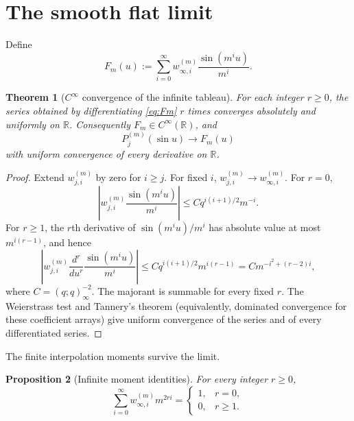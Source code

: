 \documentclass[11pt]{article}
\newtheorem{theorem}{Theorem}[section]
\newtheorem{proposition}[theorem]{Proposition}
\theoremstyle{remark}
\begin{document}
\section{The smooth flat limit}
\label{sec:limit}

Define
\begin{equation}
F_m(u)
:=
\sum_{i=0}^{\infty}w^{(m)}_{\infty,i}
\frac{\sin(m^iu)}{m^i}.
\label{eq:Fm}
\end{equation}

\begin{theorem}[$C^\infty$ convergence of the infinite tableau]
\label{thm:Cinf}
For each integer $r\ge0$, the series obtained by differentiating
\eqref{eq:Fm} $r$ times converges absolutely and uniformly on $\mathbb R$.
Consequently $F_m\in C^\infty(\mathbb R)$, and
\begin{equation}
P^{(m)}_j(\sin u)\longrightarrow F_m(u)
\label{eq:Cinfconv}
\end{equation}
with uniform convergence of every derivative on $\mathbb R$.
\end{theorem}

\begin{proof}
Extend $w^{(m)}_{j,i}$ by zero for $i\ge j$.  For fixed $i$,
$w^{(m)}_{j,i}\to w^{(m)}_{\infty,i}$.  For $r=0$,
\[
\left|w^{(m)}_{j,i}\frac{\sin(m^iu)}{m^i}\right|
\le C q^{i(i+1)/2}m^{-i}.
\]
For $r\ge1$, the $r$th derivative of
$\sin(m^iu)/m^i$ has absolute value at most $m^{i(r-1)}$, and hence
\[
\left|w^{(m)}_{j,i}
\frac{d^r}{du^r}\frac{\sin(m^iu)}{m^i}\right|
\le
C q^{i(i+1)/2}m^{i(r-1)}
=Cm^{-i^2+(r-2)i},
\]
where $C=(q;q)_\infty^{-2}$.  The majorant is summable for every fixed $r$.
The Weierstrass test and Tannery's theorem (equivalently, dominated convergence
for these coefficient arrays) give uniform convergence of the series and of
every differentiated series.
\end{proof}

The finite interpolation moments survive the limit.

\begin{proposition}[Infinite moment identities]
\label{prop:infinite-moments}
For every integer $r\ge0$,
\begin{equation}
\sum_{i=0}^{\infty}w^{(m)}_{\infty,i}m^{2ri}
=
\begin{cases}
1,&r=0,\\
0,&r\ge1.
\end{cases}
\label{eq:infinite-moments}
\end{equation}
\end{proposition}
\end{document}
